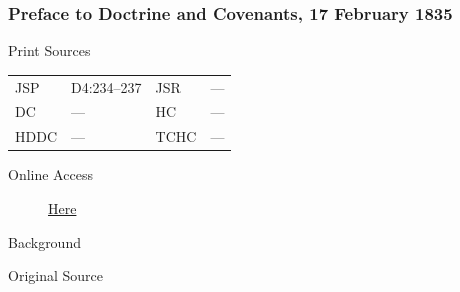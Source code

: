 		\subsubsection{Preface to Doctrine and Covenants, 17 February 1835}
			\label{EMS-1835-JS-17-FEB-1835}
			
			\begin{description}
					\item[Print Sources]
				\end{description}

					\begin{tabular}{p{0.5in}p{1in}p{0.5in}p{1in}}
					JSP	 	& D4:234--237		& JSR 		& --- \\
					DC	 	& --- 				& HC 		& --- \\
					HDDC 	& ---				& TCHC 		& --- \\
					\end{tabular}
				
				\begin{description}
					\item[Online Access] \href{https://www.josephsmithpapers.org/paper-summary/preface-to-doctrine-and-covenants-17-february-1835/1}{Here}
				\end{description}
				
				\begin{description}
					\item[Background]
				\end{description}
				
				
				\begin{description}
					\item[Original Source]
				\end{description}
				
				
